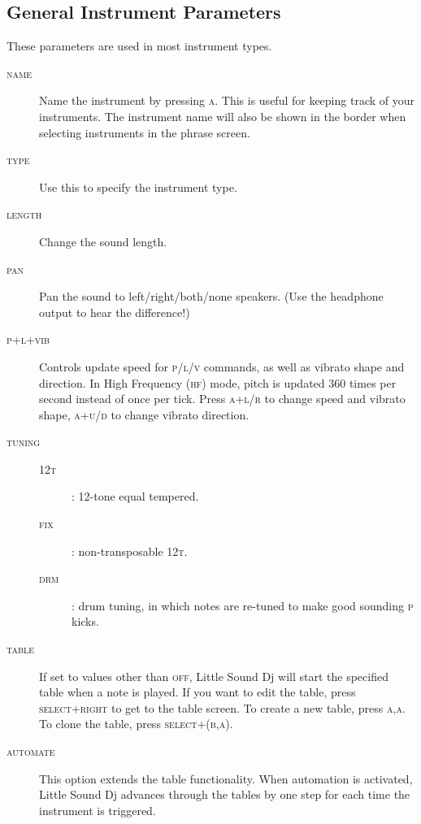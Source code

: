 \subsection{General Instrument Parameters}

These parameters are used in most instrument types.

\begin{description}
	\item[\textsc{name}] Name the instrument by pressing \textsc{a}. This is useful for keeping track of your instruments. The instrument name will also be shown in the border when selecting instruments in the phrase screen.
	\item[\textsc{type}] Use this to specify the instrument type.
	\item[\textsc{length}] Change the sound length.
	\item[\textsc{pan}] Pan the sound to left/right/both/none speakers. (Use the headphone output to hear the difference!)
    \item[\textsc{p+l+vib}] Controls update speed for \textsc{p/l/v} commands, as well as vibrato shape and direction. In High Frequency (\textsc{hf}) mode, pitch is updated 360 times per second instead of once per tick. Press \textsc{a+l/r} to change speed and vibrato shape, \textsc{a+u/d} to change vibrato direction.
    \item[\textsc{tuning}]
        \begin{description}
            \item[\textsc{12t}]: 12-tone equal tempered.
            \item[\textsc{fix}]: non-transposable \textsc{12t}.
            \item[\textsc{drm}]: drum tuning, in which notes are re-tuned to make good sounding \textsc{p} kicks.
        \end{description}
    \item[\textsc{table}] If set to values other than \textsc{off}, Little Sound Dj will start the specified table when a note is played. If you want to edit the table, press \textsc{select+right} to get to the table screen. To create a new table, press \textsc{a,a}. To clone the table, press \textsc{select+(b,a)}.
	\item[\textsc{automate}] This option extends the table functionality. When automation is activated, Little Sound Dj advances through the tables by one step for each time the instrument is triggered.
\end{description}

